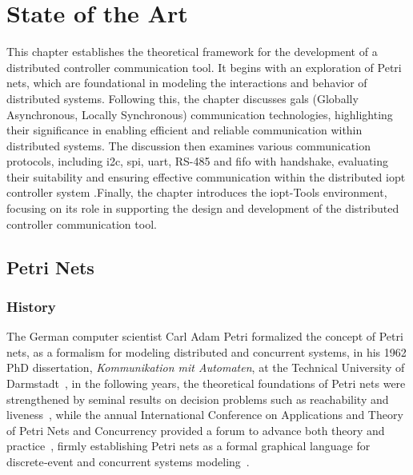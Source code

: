 
%

\chapter{State of the Art}
\label{cha:state_of_the_ art}


\epigraphfontsize{\small\itshape}
\setlength\epigraphwidth{12.5cm}
\setlength\epigraphrule{0pt}

This chapter establishes the theoretical framework for the development of a distributed controller communication tool. It begins with an exploration of Petri nets, which are foundational in modeling the interactions and behavior of distributed systems. Following this, the chapter discusses \gls{gals} (Globally Asynchronous, Locally Synchronous) communication technologies, highlighting their significance in enabling efficient and reliable communication within distributed systems. The discussion then examines various communication protocols, including \gls{i2c},  \gls{spi}, \gls{uart}, RS-485 and \gls{fifo} with handshake, evaluating their suitability and ensuring effective communication within the distributed \gls{iopt} controller system .Finally, the chapter introduces the \gls{iopt}-Tools environment, focusing on its role in supporting the design and development of the distributed controller communication tool.

\section{Petri Nets}
\label{sec:petri_nets}


\subsection{History}
\label{subsec:history}
The German computer scientist Carl Adam Petri formalized the concept of  Petri nets, as a formalism for modeling distributed and concurrent systems, in his 1962 PhD dissertation, \emph{Kommunikation mit Automaten}, at the Technical University of Darmstadt~\cite{petri1962}, in the following years, the theoretical foundations of Petri nets were strengthened by seminal results on decision problems such as reachability and liveness~\cite{murata}, while the annual International Conference on Applications and Theory of Petri Nets and Concurrency provided a forum to advance both theory and practice~\cite{ICPN1980}, firmly establishing Petri nets as a formal graphical language for discrete‐event and concurrent systems modeling~\cite{WikiPetriNet2025}.


